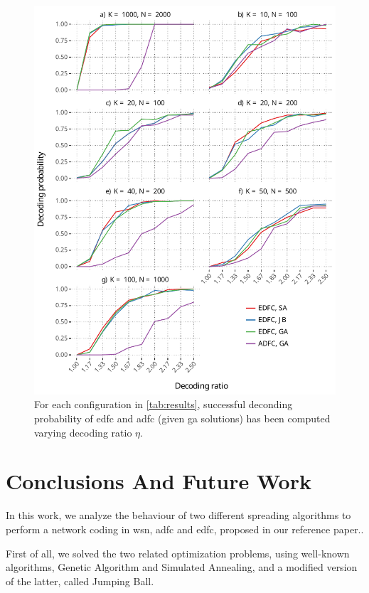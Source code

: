 \documentclass[12pt,journal,draftclsnofoot,onecolumn]{IEEEtran}
\begin{document}
\begin{figure}[htp]
	\includegraphics[]{figures/eta_vs_prob_reliable_ones.pdf}
	\caption{For each configuration in \autoref{tab:results}, successful deconding probability of \gls{edfc} and \gls{adfc} (given \gls{ga} solutions) has been computed varying decoding ratio $\eta$.}
	\label{fig:eta_vs_prob_reliable_ones}
\end{figure}

\clearpage
\section{Conclusions And Future Work}\label{sec:conclusions}
In this work, we analyze the behaviour of two different spreading algorithms to perform a network coding in \gls{wsn}, \gls{adfc} and \gls{edfc}, proposed in our reference paper.\cite{Lin2007}.

First of all, we solved the two related optimization problems, using well-known algorithms, Genetic Algorithm and Simulated Annealing, and a modified version of the latter, called Jumping Ball.
\end{document}
